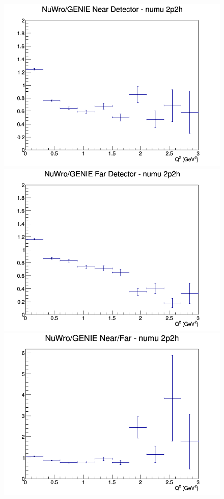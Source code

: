 \begin{figure}[h]
\endminipage
\newline
{}
\includegraphics[width=\linewidth]{eff_Q2/FGT/ratios/2p2h_NuWro_GENIE_numu_near_Q2.png}
\endminipage
{}
\includegraphics[width=\linewidth]{eff_Q2/FGT/ratios/2p2h_NuWro_GENIE_numu_far_Q2.png}
\endminipage
{}
\includegraphics[width=\linewidth]{eff_Q2/FGT/ratios/2p2h_NuWro_GENIE_numu_NF_Q2.png}
\endminipage
\newline
\end{figure}
\clearpage
